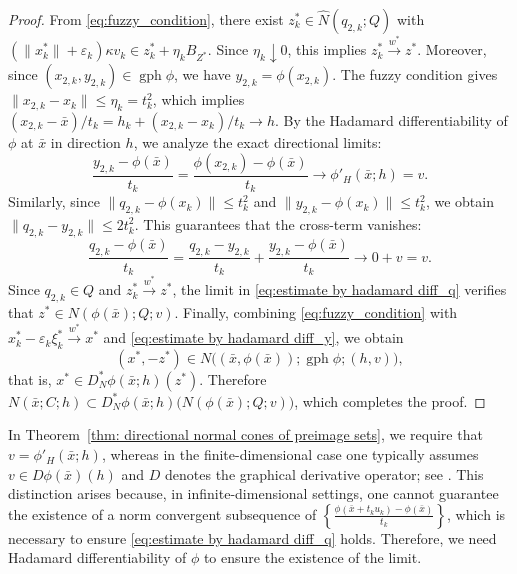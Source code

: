 \documentclass[12pt,twoside,reqno]{amsart}
\theoremstyle{definition}
\numberwithin{equation}{section}
\begin{document}
\begin{proof}
From \eqref{eq:fuzzy_condition}, there exist \( z_k^* \in \hat{N}(q_{2,k}; Q) \) with $(\|x_k^*\| + \varepsilon_k)\kappa v_k \in z_k^* + \eta_k B_{Z^*}$. Since $\eta_k \downarrow 0$, this implies \( z_k^* \xrightarrow{w^*} z^* \). 
Moreover, since \( (x_{2,k}, y_{2,k}) \in \operatorname{gph}\phi \), we have $y_{2,k} = \phi(x_{2,k})$. The fuzzy condition gives $\|x_{2,k} - x_k\| \le \eta_k = t_k^2$, which implies $(x_{2,k} - \bar{x})/t_k = h_k + (x_{2,k} - x_k)/t_k \to h$.
By the Hadamard differentiability of \( \phi \) at \( \bar{x} \) in direction \( h \), we analyze the exact directional limits:
\begin{equation}\label{eq:estimate by hadamard diff_y}
    \frac{y_{2,k} - \phi(\bar{x})}{t_k} = \frac{\phi(x_{2,k}) - \phi(\bar{x})}{t_k} \to \phi'_H(\bar{x}; h) = v.
\end{equation}
Similarly, since $\|q_{2,k} - \phi(x_k)\| \le t_k^2$ and $\|y_{2,k} - \phi(x_k)\| \le t_k^2$, we obtain $\|q_{2,k} - y_{2,k}\| \le 2t_k^2$. This guarantees that the cross-term vanishes:
\begin{equation}\label{eq:estimate by hadamard diff_q}
    \frac{q_{2,k} - \phi(\bar{x})}{t_k} = \frac{q_{2,k} - y_{2,k}}{t_k} + \frac{y_{2,k} - \phi(\bar{x})}{t_k} \to 0 + v = v.
\end{equation}
Since \( q_{2,k} \in Q \) and $z_k^* \xrightarrow{w^*} z^*$, the limit in \eqref{eq:estimate by hadamard diff_q} verifies that \( z^* \in N(\phi(\bar{x}); Q; v) \). 
Finally, combining \eqref{eq:fuzzy_condition} with \( x_k^* - \varepsilon_k \xi_k^* \xrightarrow{w^*} x^* \) and \eqref{eq:estimate by hadamard diff_y}, we obtain
\[
(x^*, -z^*) \in N\bigl((\bar{x}, \phi(\bar{x})); \operatorname{gph} \phi; (h, v)\bigr),
\]
that is, $x^* \in D^*_N \phi(\bar{x}; h)(z^*)$. 
Therefore $N(\bar{x}; C; h) \subset D^*_N \phi(\bar{x}; h) \big( N(\phi(\bar{x}); Q; v) \big)$, which completes the proof. 
\end{proof}

In Theorem~\ref{thm: directional normal cones of preimage sets}, we require that \( v = \phi'_H(\bar{x}; h) \), whereas in the finite-dimensional case one typically assumes \( v \in D\phi(\bar{x})(h) \) and $D$ denotes the graphical derivative operator; see \cite[Theorem~3.1]{benko2019calculus}. 
This distinction arises because, in infinite-dimensional settings, one cannot guarantee the existence of a norm convergent subsequence of $\left\{ \frac{\phi(\bar{x} + t_k u_k) - \phi(\bar{x})}{t_k} \right\}$, 
which is necessary to ensure \eqref{eq:estimate by hadamard diff_q} holds. Therefore, we need Hadamard differentiability of \( \phi \) to ensure the existence of the limit.  
\end{document}
